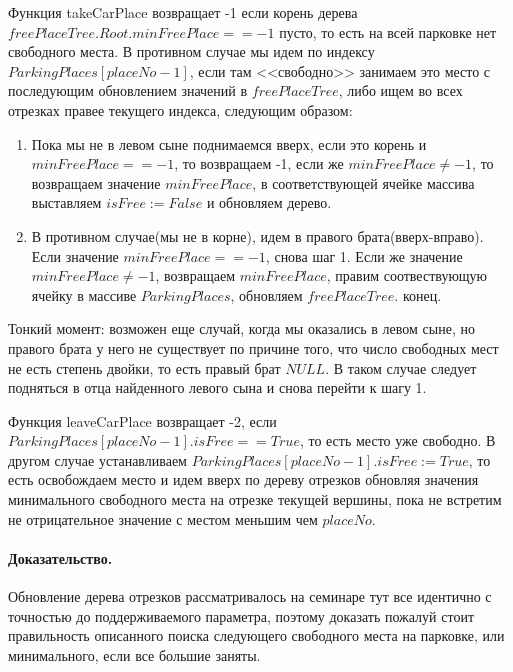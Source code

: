 \documentclass[12pt]{article}
\begin{document}
Функция takeCarPlace возвращает -1 если корень дерева
$ freePlaceTree.Root.minFreePlace == -1 $ пусто, то есть на всей парковке нет
свободного места.
В противном случае мы идем по индексу $ ParkingPlaces[placeNo - 1] $, если там
<<свободно>> занимаем это место с последующим обновлением значений в $ freePlaceTree $,
либо ищем во всех отрезках правее текущего индекса, следующим образом:
\begin{enumerate}
    \item Пока мы не в левом сыне поднимаемся вверх, если это корень и $ minFreePlace == -1$,
          то возвращаем -1, если же $ minFreePlace \ne -1 $, то возвращаем значение
          $ minFreePlace $, в соответствующей ячейке массива выставляем $ isFree := False $
          и обновляем дерево.

    \item В противном случае(мы не в корне), идем в правого брата(вверх-вправо). Если значение
          $ minFreePlace == -1 $, снова шаг 1. Если же значение $ minFreePlace \ne -1 $,
          возвращаем $ minFreePlace $, правим соотвествующую ячейку в массиве $ ParkingPlaces $,
          обновляем $ freePlaceTree $. конец.
\end{enumerate}

Тонкий момент: возможен еще случай, когда мы оказались в левом сыне, но правого брата у него не существует
по причине того, что число свободных мест не есть степень двойки, то есть правый брат $ NULL $.
В таком случае следует подняться в отца найденного левого сына и снова перейти к шагу 1.

Функция leaveCarPlace возвращает -2, если
$ ParkingPlaces[placeNo - 1].isFree == True $, то есть место уже свободно.
В другом случае устанавливаем $ ParkingPlaces[placeNo - 1].isFree := True $,
то есть освобождаем место и идем вверх по дереву отрезков
обновляя значения минимального свободного места на отрезке текущей вершины,
пока не встретим не отрицательное значение с местом меньшим чем $ placeNo $.



\paragraph{Доказательство.}
Обновление дерева отрезков рассматривалось на семинаре тут все идентично
с точностью до поддерживаемого параметра, поэтому доказать пожалуй стоит
правильность описанного поиска следующего свободного места на парковке, или
минимального, если все большие заняты.
\end{document}
